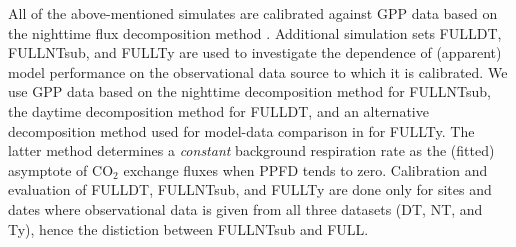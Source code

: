 \documentclass{myreport}
\begin{document}
All of the above-mentioned simulates are calibrated against GPP data based on the nighttime flux decomposition method \citep{Reichstein2005-mp}. Additional simulation sets FULL\textunderscore DT, FULL\textunderscore NTsub, and FULL\textunderscore Ty are used to investigate the dependence of (apparent) model performance on the observational data source to which it is calibrated. We use GPP data based on the nighttime decomposition method \citep{Reichstein2005-mp} for FULL\textunderscore NTsub, the daytime decomposition method \citep{lasslop10} for FULL\textunderscore DT, and an alternative decomposition method used for model-data comparison in \cite{wang17natpl} for FULL\textunderscore Ty. The latter method determines a \textit{constant} background respiration rate as the (fitted) asymptote of CO$_2$ exchange fluxes when PPFD tends to zero. Calibration and evaluation of FULL\textunderscore DT, FULL\textunderscore NTsub, and FULL\textunderscore Ty are done only for sites and dates where observational data is given from all three datasets (DT, NT, and Ty), hence the distiction between FULL\textunderscore NTsub and FULL. 
\end{document}
